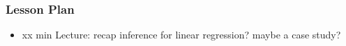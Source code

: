 \begin{frame}
    \frametitle{Lesson Plan}
    \begin{itemize}
        \item xx min Lecture: recap inference for linear regression? maybe a case study?
    \end{itemize}
\end{frame}

